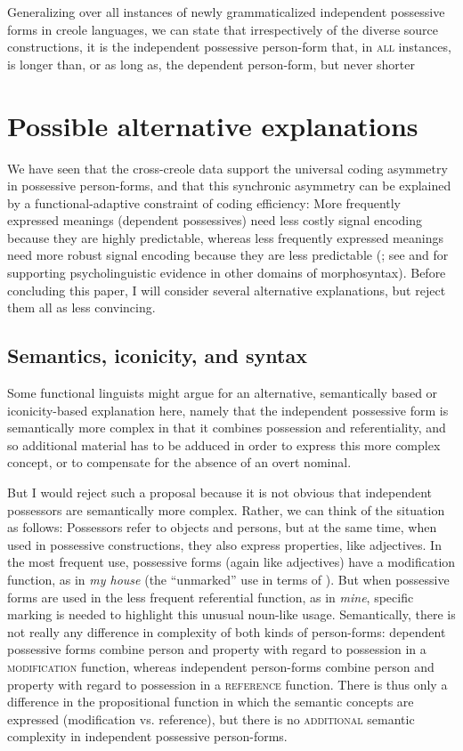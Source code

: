 \documentclass[output=paper]{langsci/langscibook}
\begin{document}
Generalizing over all instances of newly grammaticalized independent possessive forms in creole languages, we can state that irrespectively of the diverse source constructions, it is the independent possessive person-form that, in \textsc{all} instances, is longer than, or as long as, the dependent person-form, but never shorter


\section{Possible alternative explanations}

We have seen that the cross-creole data support the universal coding asymmetry in possessive person-forms, and that this synchronic asymmetry can be explained by a functional-adaptive constraint of coding efficiency: More frequently expressed meanings (dependent possessives) need less costly signal encoding because they are highly predictable, whereas less frequently expressed meanings need more robust signal encoding because they are less predictable (\citealt{Haspelmath2019 [this volume]}; see \citealt{NorcliffeJaeger2016} and \citealt{JaegerBuz2018} for supporting psycholinguistic evidence in other domains of morphosyntax). Before concluding this paper, I will consider several alternative explanations, but reject them all as less convincing.


\subsection{ Semantics, iconicity, and syntax}

Some functional linguists might argue for an alternative, semantically based or iconicity-based explanation here, namely that the independent possessive form is semantically more complex in that it combines possession and referentiality, and so additional material has to be adduced in order to express this more complex concept, or to compensate for the absence of an overt nominal. 

But I would reject such a proposal because it is not obvious that independent possessors are semantically more complex. Rather, we can think of the situation as follows: Possessors refer to objects and persons, but at the same time, when used in possessive constructions, they also express properties, like adjectives. In the most frequent use, possessive forms (again like adjectives) have a modification function, as in \textit{my house} (the “unmarked” use in terms of \citealt{Croft1991}). But when possessive forms are used in the less frequent referential function, as in \textit{mine}, specific marking is needed to highlight this unusual noun-like usage. Semantically, there is not really any difference in complexity of both kinds of person-forms: dependent possessive forms combine person and property with regard to possession in a \textsc{modification} function, whereas independent person-forms combine person and property with regard to possession in a \textsc{reference} function. There is thus only a difference in the propositional function in which the semantic concepts are expressed (modification vs. reference), but there is no \textsc{additional} semantic complexity in independent possessive person-forms. 
\end{document}
